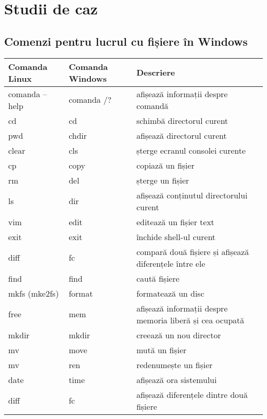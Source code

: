 \section{Studii de caz}
\label{sec:file-system-case}

\subsection{Comenzi pentru lucrul cu fișiere în Windows}
\label{sec:file-system-case-windows}

\begin{table}[htb]
\begin{center}
	\begin{tabular}{ | p{} | p{} |  p{} | }
	\hline
		\textbf{Comanda Linux} & \textbf{Comanda Windows} & \textbf{Descriere} \\
	\hline
		comanda --help & comanda /? & afișează informații despre comandă \\
	\hline
		cd & cd & schimbă directorul curent \\
	\hline
		pwd & chdir & afișează directorul curent \\
	\hline
		clear & cls & șterge ecranul consolei curente \\
	\hline
		cp & copy & copiază un fișier \\
	\hline
		rm & del & șterge un fișier \\
	\hline
		ls & dir & afișează conținutul directorului curent \\
	\hline
		vim & edit & editează un fișier text \\
	\hline
		exit & exit & închide shell-ul curent \\
	\hline
		diff & fc & compară două fișiere și afișează diferențele între ele \\
	\hline
		find & find & caută fișiere \\
	\hline
		mkfs (mke2fs) & format & formatează un disc \\
	\hline
		free & mem & afișează informații despre memoria liberă și cea ocupată \\
	\hline
		mkdir & mkdir & creează un nou director \\
	\hline
		mv & move & mută un fișier \\
	\hline
		mv & ren & redenumește un fișier \\
	\hline
		date & time & afișează ora sistemului \\
	\hline
		diff & fc & afișează diferențele dintre două fișiere \\
	\hline
	\end{tabular}
	\label{table:file-system-case-study}
\end{center}
\end{table}
